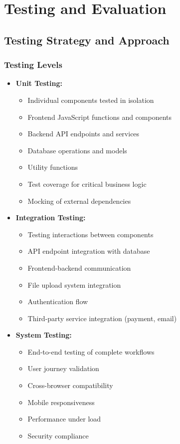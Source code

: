 \chapter{Testing and Evaluation}

\section{Testing Strategy and Approach}
\subsection{Testing Levels}
\begin{itemize}
    \item \textbf{Unit Testing:}
    \begin{itemize}
        \item Individual components tested in isolation
        \item Frontend JavaScript functions and components
        \item Backend API endpoints and services
        \item Database operations and models
        \item Utility functions
        \item Test coverage for critical business logic
        \item Mocking of external dependencies
    \end{itemize}
    
    \item \textbf{Integration Testing:}
    \begin{itemize}
        \item Testing interactions between components
        \item API endpoint integration with database
        \item Frontend-backend communication
        \item File upload system integration
        \item Authentication flow
        \item Third-party service integration (payment, email)
    \end{itemize}
    
    \item \textbf{System Testing:}
    \begin{itemize}
        \item End-to-end testing of complete workflows
        \item User journey validation
        \item Cross-browser compatibility
        \item Mobile responsiveness
        \item Performance under load
        \item Security compliance
    \end{itemize}
    

\end{itemize}
